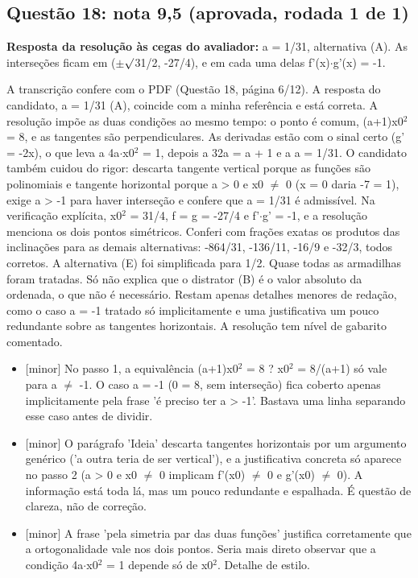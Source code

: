 \documentclass{article}%
\begin{document}
\subsection*{Questão 18: nota 9,5 (aprovada, rodada 1 de 1)}%
\textbf{Resposta da resolução às cegas do avaliador:} a = 1/31, alternativa (A). As interseções ficam em ($\pm$$\surd$31/2, -27/4), e em cada uma delas f'(x)$\cdot$g'(x) = -1.\par %
A transcrição confere com o PDF (Questão 18, página 6/12). A resposta do candidato, a = 1/31 (A), coincide com a minha referência e está correta. A resolução impõe as duas condições ao mesmo tempo: o ponto é comum, (a+1)x0$^2$ = 8, e as tangentes são perpendiculares. As derivadas estão com o sinal certo (g' = -2x), o que leva a 4a$\cdot$x0$^2$ = 1, depois a 32a = a + 1 e a a = 1/31. O candidato também cuidou do rigor: descarta tangente vertical porque as funções são polinomiais e tangente horizontal porque a > 0 e x0 $\neq$ 0 (x = 0 daria -7 = 1), exige a > -1 para haver interseção e confere que a = 1/31 é admissível. Na verificação explícita, x0$^2$ = 31/4, f = g = -27/4 e f'$\cdot$g' = -1, e a resolução menciona os dois pontos simétricos. Conferi com frações exatas os produtos das inclinações para as demais alternativas: -864/31, -136/11, -16/9 e -32/3, todos corretos. A alternativa (E) foi simplificada para 1/2. Quase todas as armadilhas foram tratadas. Só não explica que o distrator (B) é o valor absoluto da ordenada, o que não é necessário. Restam apenas detalhes menores de redação, como o caso a = -1 tratado só implicitamente e uma justificativa um pouco redundante sobre as tangentes horizontais. A resolução tem nível de gabarito comentado.%
\begin{itemize}%
\item%
{[}minor{]} No passo 1, a equivalência (a+1)x0$^2$ = 8 ? x0$^2$ = 8/(a+1) só vale para a $\neq$ -1. O caso a = -1 (0 = 8, sem interseção) fica coberto apenas implicitamente pela frase 'é preciso ter a > -1'. Bastava uma linha separando esse caso antes de dividir.%
\item%
{[}minor{]} O parágrafo 'Ideia' descarta tangentes horizontais por um argumento genérico ('a outra teria de ser vertical'), e a justificativa concreta só aparece no passo 2 (a > 0 e x0 $\neq$ 0 implicam f'(x0) $\neq$ 0 e g'(x0) $\neq$ 0). A informação está toda lá, mas um pouco redundante e espalhada. É questão de clareza, não de correção.%
\item%
{[}minor{]} A frase 'pela simetria par das duas funções' justifica corretamente que a ortogonalidade vale nos dois pontos. Seria mais direto observar que a condição 4a$\cdot$x0$^2$ = 1 depende só de x0$^2$. Detalhe de estilo.%
\end{itemize}%
\end{document}
